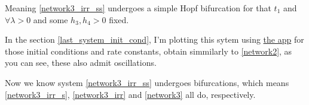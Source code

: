 Meaning \ref{network3_irr_ss} undergoes a simple Hopf bifurcation for that $t_1$ and $\forall \lambda > 0$ and some $h_3, h_4 > 0$ fixed.

In the section \ref{last_system_init_cond}, I'm plotting this sytem using \href{https://github.com/viktorashi/bachelor-thesis.git}{the app} for those initial conditions and rate constants, obtain simmilarly to \ref{network2}, as you can see, these also admit oscillations.

Now we know system \ref{network3_irr_ss} undergoes bifurcations, which means \ref{network3_irr_s}, \ref{network3_irr} and \ref{network3} all do, respectively.
